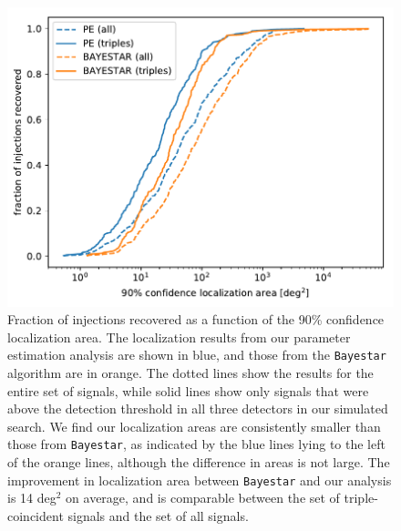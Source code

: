 \begin{figure}[ht]
\includegraphics[width=\textwidth]{Figures/rel-bin-pe/localization_cumulative_allinj_eps0p03.pdf}
\caption{Fraction of injections recovered as a function of the 90\% confidence localization area. The localization results from our parameter estimation analysis are shown in blue, and those from the \texttt{Bayestar} algorithm are in orange. The dotted lines show the results for the entire set of signals, while solid lines show only signals that were above the detection threshold in all three detectors in our simulated search. We find our localization areas are consistently smaller than those from \texttt{Bayestar}, as indicated by the blue lines lying to the left of the orange lines, although the difference in areas is not large. The improvement in localization area between \texttt{Bayestar} and our analysis is 14 deg$^2$ on average, and is comparable between the set of triple-coincident signals and the set of all signals.}
\label{fig:localization}
\end{figure}

